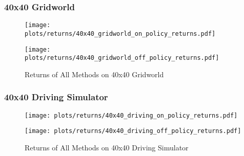 \documentclass{beamer}
\begin{document}
\begin{frame}
\frametitle{40x40 Gridworld}

\begin{figure}
  \begin{center}
  \begin{minipage}{0.45\linewidth}
    \centering
    \texttt{[image: plots/returns/40x40\_gridworld\_on\_policy\_returns.pdf]}
  \end{minipage}
  \hspace{0.05\linewidth}
  \begin{minipage}{0.45\linewidth}
    \centering
    \texttt{[image: plots/returns/40x40\_gridworld\_off\_policy\_returns.pdf]}
  \end{minipage}
  \end{center}
\caption{Returns of All Methods on 40x40 Gridworld}
\end{figure}

\end{frame}

\begin{frame}
	\frametitle{40x40 Driving Simulator}
\begin{figure}
  \begin{center}
  \begin{minipage}{0.45\linewidth}
    \centering
    \texttt{[image: plots/returns/40x40\_driving\_on\_policy\_returns.pdf]}
  \end{minipage}
  \hspace{0.05\linewidth}
  \begin{minipage}{0.45\linewidth}
    \centering
    \texttt{[image: plots/returns/40x40\_driving\_off\_policy\_returns.pdf]}
  \end{minipage}
  \end{center}
\caption{Returns of All Methods on 40x40 Driving Simulator}
\end{figure}
\end{frame}
\end{document}
